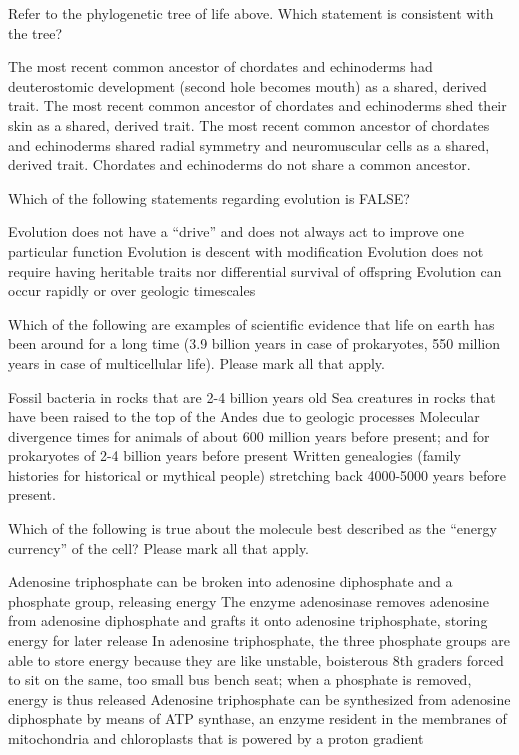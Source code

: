 \documentclass[exam,addpoints,noanswers]{exam}
\begin{document}
\begin{questions}
\question[1] Refer to the phylogenetic tree of life above. Which statement is consistent with the tree? 
\begin{choices}
\CorrectChoice The most recent common ancestor of chordates and echinoderms had deuterostomic development (second hole becomes mouth) as a shared, derived trait.
\choice The most recent common ancestor of chordates and echinoderms shed their skin as a shared, derived trait.
\choice The most recent common ancestor of chordates and echinoderms shared radial symmetry and neuromuscular cells as a shared, derived trait. 
\choice Chordates and echinoderms do not share a common ancestor. 
\end{choices}


\question[1] Which of the following statements regarding evolution is FALSE?
\begin{choices}
\choice Evolution does not have a ``drive'' and does not always act to improve one particular function
\choice Evolution is descent with modification
\CorrectChoice Evolution does not require having heritable traits nor differential survival of offspring
\choice Evolution can occur rapidly or over geologic timescales
\end{choices}



\question[1] Which of the following are examples of scientific evidence that life on earth has been around for a long time (3.9 billion years in case of prokaryotes, 550 million years in case of multicellular life). Please mark all that apply.
\begin{choices} 
\CorrectChoice Fossil bacteria in rocks that are 2-4 billion years old
\CorrectChoice Sea creatures in rocks that have been raised to the top of the Andes due to geologic processes
\CorrectChoice Molecular divergence times for animals of about 600 million years before present; and for prokaryotes of 2-4 billion years before present
\choice Written genealogies (family histories for historical or mythical people) stretching back 4000-5000 years before present. 
\end{choices}




\question[1] Which of the following is true about the molecule best described as the ``energy currency'' of the cell? Please mark all that apply. 
\begin{choices}
\CorrectChoice Adenosine triphosphate can be broken into adenosine diphosphate and a phosphate group, releasing energy
\choice The enzyme adenosinase removes adenosine from adenosine diphosphate and grafts it onto adenosine triphosphate, storing energy for later release
\CorrectChoice In adenosine triphosphate, the three phosphate groups are able to store energy because they are like unstable, boisterous 8th graders forced to sit on the same, too small bus bench seat; when a phosphate is removed, energy is thus released
\CorrectChoice Adenosine triphosphate can be synthesized from adenosine diphosphate by means of ATP synthase, an enzyme resident in the membranes of mitochondria and chloroplasts that is powered by a proton gradient
\end{choices}




\end{questions}
\end{document}
